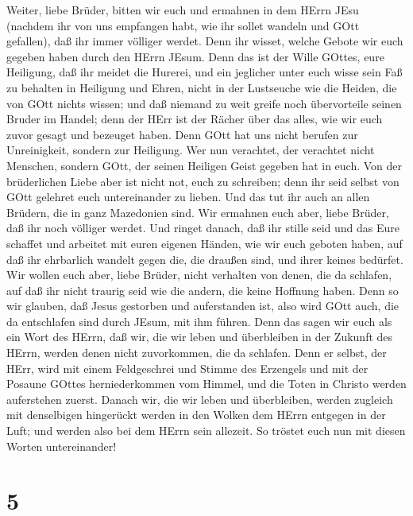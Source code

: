  Weiter, liebe Brüder, bitten wir euch und ermahnen in dem
HErrn JEsu (nachdem ihr von uns empfangen habt, wie ihr sollet wandeln
und GOtt gefallen), daß ihr immer völliger werdet.  Denn ihr
wisset, welche Gebote wir euch gegeben haben durch den HErrn JEsum.
 Denn das ist der Wille GOttes, eure Heiligung, daß ihr
meidet die Hurerei,  und ein jeglicher unter euch wisse sein
Faß zu behalten in Heiligung und Ehren,  nicht in der
Lustseuche wie die Heiden, die von GOtt nichts wissen;  und
daß niemand zu weit greife noch übervorteile seinen Bruder im Handel;
denn der HErr ist der Rächer über das alles, wie wir euch zuvor gesagt
und bezeuget haben.  Denn GOtt hat uns nicht berufen zur
Unreinigkeit, sondern zur Heiligung.  Wer nun verachtet, der
verachtet nicht Menschen, sondern GOtt, der seinen Heiligen Geist
gegeben hat in euch.  Von der brüderlichen Liebe aber ist
nicht not, euch zu schreiben; denn ihr seid selbst von GOtt gelehret
euch untereinander zu lieben.  Und das tut ihr auch an
allen Brüdern, die in ganz Mazedonien sind. Wir ermahnen euch aber,
liebe Brüder, daß ihr noch völliger werdet.  Und ringet
danach, daß ihr stille seid und das Eure schaffet und arbeitet mit euren
eigenen Händen, wie wir euch geboten haben,  auf daß ihr
ehrbarlich wandelt gegen die, die draußen sind, und ihrer keines
bedürfet.  Wir wollen euch aber, liebe Brüder, nicht
verhalten von denen, die da schlafen, auf daß ihr nicht traurig seid wie
die andern, die keine Hoffnung haben.  Denn so wir glauben,
daß Jesus gestorben und auferstanden ist, also wird GOtt auch, die da
entschlafen sind durch JEsum, mit ihm führen.  Denn das
sagen wir euch als ein Wort des HErrn, daß wir, die wir leben und
überbleiben in der Zukunft des HErrn, werden denen nicht zuvorkommen,
die da schlafen.  Denn er selbst, der HErr, wird mit einem
Feldgeschrei und Stimme des Erzengels und mit der Posaune GOttes
herniederkommen vom Himmel, und die Toten in Christo werden auferstehen
zuerst.  Danach wir, die wir leben und überbleiben, werden
zugleich mit denselbigen hingerückt werden in den Wolken dem HErrn
entgegen in der Luft; und werden also bei dem HErrn sein allezeit.
 So tröstet euch nun mit diesen Worten untereinander!

\hypertarget{section-4}{%
\section{5}\label{section-4}}

